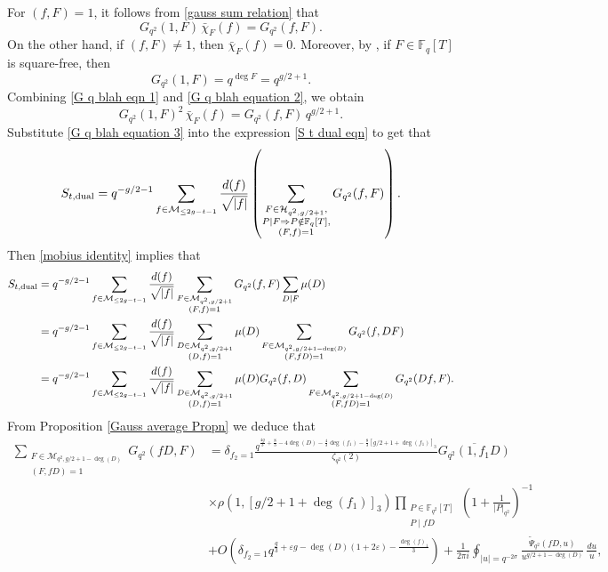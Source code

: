 \documentclass[table]{amsart}
\newcommand{\cM}{\mathcal{M}}
\numberwithin{equation}{section}
\begin{document}
For \((f, F) = 1\), it follows from \eqref{gauss sum relation} that  
\begin{equation}\label{G q blah eqn 1}
    G_{q^2}(1, F)\, \bar{\chi}_F(f) = G_{q^2}(f, F).
\end{equation}
On the other hand, if $(f,F)\neq 1$, then \(\bar{\chi}_F(f) = 0.\)
Moreover, by \cite[Lemma 4.4]{DFLCubic}, if \(F \in \mathbb{F}_q[T]\) is square-free, then  
\begin{equation}\label{G q blah equation 2}
    G_{q^2}(1, F) = q^{\deg F}=q^{g/2+1}.
\end{equation}
Combining \eqref{G q blah eqn 1} and \eqref{G q blah equation 2}, we obtain  
\begin{equation}\label{G q blah equation 3}
    G_{q^2}(1, F)^2 \, \bar{\chi}_F(f) = G_{q^2}(f, F) \, q^{g/2+1}.
\end{equation}
Substitute \eqref{G q blah equation 3} into the expression \eqref{S t dual eqn} to get that 
\[ S_{t, \rm{dual}}=q^{-g/2-1}\sum_{f\in \cM_{\leq 2g-t-1}}  \frac{d(f)}{\sqrt{|f|}}\left(\sum_{\substack{F \in \mathcal{H}_{q^{2}, g / 2+1},\\  P \mid F \Rightarrow P \notin \mathbb{F}_{q}[T], \\ (F,f)=1}} G_{q^2}(f, F)\right).\]
\noindent Then \eqref{mobius identity} implies that
\begin{align*}
    S_{t, \rm{dual}} &=q^{-g/2-1}\sum_{f\in \cM_{\leq 2g-t-1}}  \frac{d(f)}{\sqrt{|f|}}\sum_{\substack{F \in \mathcal{M}_{q^{2}, g / 2+1} \\(F,f)=1}}G_{q^2}(f,F) \sum_{D\mid F}\mu(D)\\
    &=q^{-g/2-1}\sum_{f\in \cM_{\leq 2g-t-1}}  \frac{d(f)}{\sqrt{|f|}}\sum_{\substack{D \in \mathcal{M}_{q^{2}, g / 2+1} \\(D,f)=1}}\mu(D) \sum_{\substack{F \in \mathcal{M}_{q^{2}, g / 2+1-\deg(D)} \\(F,fD)=1}}G_{q^2}(f,DF) \\
    &=q^{-g/2-1}\sum_{f\in \cM_{\leq 2g-t-1}}  \frac{d(f)}{\sqrt{|f|}}\sum_{\substack{D \in \mathcal{M}_{q^{2}, g / 2+1} \\(D,f)=1}}\mu(D) G_{q^2}(f,D)\sum_{\substack{F \in \mathcal{M}_{q^{2}, g / 2+1-\deg(D)} \\(F,fD)=1}}G_{q^2}(Df,F) .
\end{align*}
\noindent From Proposition \ref{Gauss average Propn} we deduce that 
{\small\[\begin{split}
\sum_{\substack{F \in \mathcal{M}_{q^2,g/2+1-\deg(D)}\\(F,fD)=1}}   G_{q^2}(fD,F) & = \delta_{f_2=1} \frac{q^{\frac{4g}{3}+\frac{8}{3}-4\deg(D)-\frac{4}{3}\deg(f_1) - \frac{8}{3} [g/2+1+ \deg(f_1)]_3}}{\zeta_{q^2}(2)}
\overline{G_{q^2}(1,f_1D)} \nonumber\\
&\times \rho(1, [g/2+1+\deg(f_1)]_3)\prod_{\substack{P \in \mathbb{F}_{q^2}[T] \\P\mid fD}} \left (1+ \frac{1}{|P|_{q^2}} \right )^{-1}\nonumber\\
& +O \left(\delta_{f_2=1}q^{\frac{g}{3}+\varepsilon g-\deg(D)(1+2\varepsilon)-\frac{\deg(f)_1}{3}} \right) + \frac{1}{2 \pi i} \oint_{|u|=q^{-2\sigma}} \frac{ \tilde{\Psi}_{q^2}(fD,u)}{u^{g/2+1-\deg(D)}} \, \frac{du}{u},
\end{split}\]}
\end{document}
